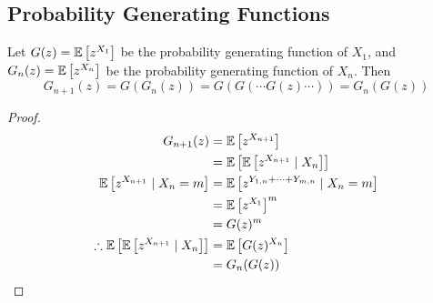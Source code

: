 \subsection{Probability Generating Functions}
\begin{theorem}
	Let \(G(z) = \mathbb{E}\left[{z^{X_1}}\right]\) be the probability generating function of \(X_1\), and \(G_n(z) = \mathbb{E}\left[{z^{X_n}}\right]\) be the probability generating function of \(X_n\).
	Then
	\[
		G_{n+1}(z) = G(G_n(z)) = G(G(\cdots G(z)\cdots)) = G_n(G(z))
	\]
\end{theorem}
\begin{proof}
	\begin{align*}
		G_{n+1}(z)                                        & = \mathbb{E}\left[{z^{X_{n+1}}}\right]                                 \\
		                                                  & = \mathbb{E}\left[{\mathbb{E}\left[{z^{X_{n+1}} \mid X_n}\right]}\right]               \\
		\mathbb{E}\left[{z^{X_{n+1}} \mid X_n = m}\right]                 & = \mathbb{E}\left[{z^{Y_{1, n} + \dots + Y_{m,n}} \mid X_n = m}\right] \\
		                                                  & = \mathbb{E}\left[{z^{X_1}}\right]^m                                   \\
		                                                  & = G(z)^m                                               \\
		\therefore \mathbb{E}\left[{\mathbb{E}\left[{z^{X_{n+1}} \mid X_n}\right]}\right] & = \mathbb{E}\left[{G(z)^{X_n}}\right]                                  \\
		                                                  & = G_n(G(z))
	\end{align*}
\end{proof}

